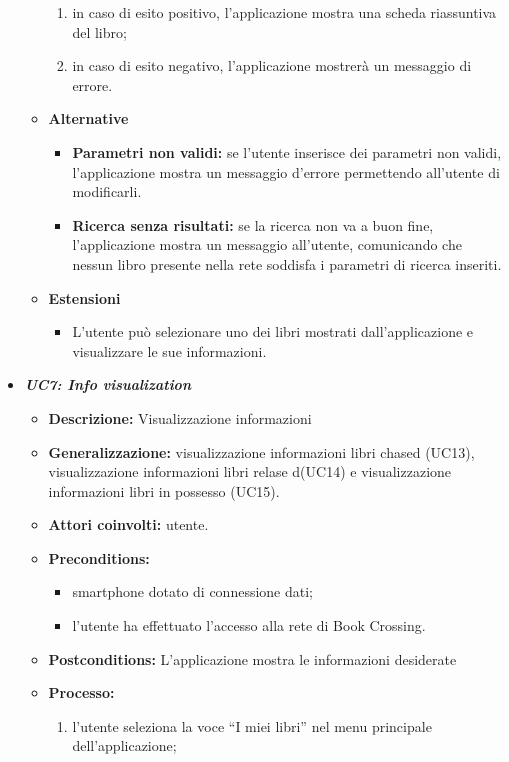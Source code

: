\begin{itemize}
\begin{itemize}
\begin{enumerate}
			\item in caso di esito positivo, l’applicazione mostra una scheda riassuntiva del libro;
			\item in caso di esito negativo, l’applicazione mostrerà un messaggio di errore.
		\end{enumerate}
		\item \textbf{Alternative}
		\begin{itemize}
			\item \textbf{Parametri non validi:} se l'utente inserisce dei parametri non validi, l'applicazione mostra un messaggio d'errore permettendo all'utente di modificarli.
			\item \textbf{Ricerca senza risultati:} se la ricerca non va a buon fine, l'applicazione mostra un messaggio all'utente, comunicando che nessun libro presente nella rete soddisfa i parametri di ricerca inseriti.
		\end{itemize}
		\item \textbf{Estensioni}
		\begin{itemize}
			\item L'utente può selezionare uno dei libri mostrati dall'applicazione e visualizzare le sue informazioni.
		\end{itemize}
	\end{itemize}
	\item \textbf{\textit{UC7: Info visualization}}
	\begin{itemize}
		\item \textbf{Descrizione: } Visualizzazione informazioni
		\item \textbf{Generalizzazione:} visualizzazione informazioni libri chased (UC13), visualizzazione informazioni libri relase d(UC14) e visualizzazione informazioni libri in possesso (UC15).
		\item \textbf{Attori coinvolti:} utente.
		\item \textbf{Preconditions:}
		\begin{itemize}
			\item smartphone dotato di connessione dati;
			\item l’utente ha effettuato l’accesso alla rete di Book Crossing.
		\end{itemize}
		\item \textbf{Postconditions:} L’applicazione mostra le informazioni desiderate
		\item \textbf{Processo:}
		\begin{enumerate}
			\item l’utente seleziona la voce “I miei libri” nel menu principale dell’applicazione;

\end{enumerate}
\end{itemize}
\end{itemize}
